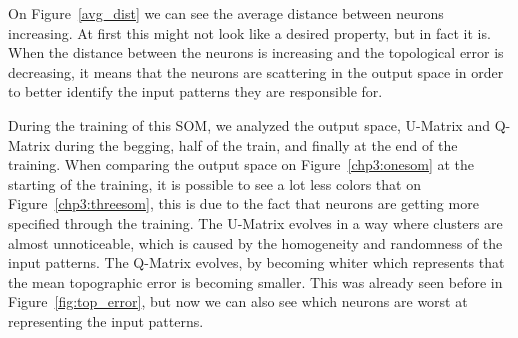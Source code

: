 On Figure~\ref{avg_dist} we can see the average distance between neurons increasing. At first this might not look like a desired property, but in fact it is. When the distance between the neurons is increasing and the topological error is decreasing, it means that the neurons are scattering in the output space in order to better identify the input patterns they are responsible for.

During the training of this \ac{SOM}, we analyzed the output space, \ac{U-Matrix} and \ac{Q-Matrix} during the begging, half of the train, and finally at the end of the training.
When comparing the output space on Figure~\ref{chp3:onesom} at the starting of the training, it is possible to see a lot less colors that on Figure~\ref{chp3:threesom}, this is due to the fact that neurons are getting more specified through the training. 
The \ac{U-Matrix} evolves in a way where clusters are almost unnoticeable, which is caused by the homogeneity and randomness of the input patterns.
The \ac{Q-Matrix} evolves, by becoming whiter which represents that the mean topographic error is becoming smaller. This was already seen before in Figure~\ref{fig:top_error}, but now we can also see which neurons are worst at representing the input patterns.  

